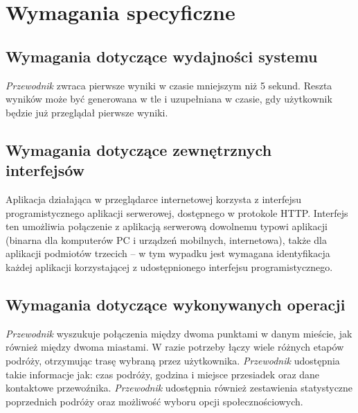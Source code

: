 \documentclass[12pt,a4paper]{report}
\begin{document}
\section{Wymagania specyficzne}
\subsection{Wymagania dotyczące wydajności systemu}
	\emph{Przewodnik} zwraca pierwsze wyniki w czasie mniejszym niż 5 sekund. Reszta wyników może być generowana w tle i uzupełniana w czasie, gdy użytkownik będzie już przeglądał pierwsze wyniki.

\subsection{Wymagania dotyczące zewnętrznych interfejsów}
Aplikacja działająca w przeglądarce internetowej korzysta z interfejsu programistycznego aplikacji serwerowej, dostępnego w protokole HTTP. Interfejs ten umożliwia połączenie z aplikacją serwerową dowolnemu typowi aplikacji (binarna dla komputerów PC i urządzeń mobilnych, internetowa), także dla aplikacji podmiotów trzecich -- w tym wypadku jest wymagana identyfikacja każdej aplikacji korzystającej z udostępnionego interfejsu programistycznego.
\subsection{Wymagania dotyczące wykonywanych operacji}
	\emph{Przewodnik} wyszukuje połączenia między dwoma punktami w danym mieście, jak również między dwoma miastami. W razie potrzeby łączy wiele różnych etapów podróży, otrzymując trasę wybraną przez użytkownika. \emph{Przewodnik} udostępnia takie informacje jak: czas podróży, godzina i miejsce przesiadek oraz dane kontaktowe przewoźnika. \emph{Przewodnik} udostępnia również zestawienia statystyczne poprzednich podróży oraz możliwość wyboru opcji społecznościowych.
\newpage
\end{document}
